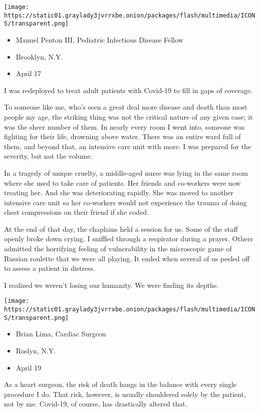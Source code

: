 \texttt{[image: https://static01.graylady3jvrrxbe.onion/packages/flash/multimedia/ICONS/transparent.png]}

\begin{itemize}
\tightlist
\item
  Manuel Penton III, Pediatric Infectious Disease Fellow
\item
  Brooklyn, N.Y.
\item
  April 17
\end{itemize}

I was redeployed to treat adult patients with Covid-19 to fill in gaps
of coverage.

To someone like me, who's seen a great deal more disease and death than
most people my age, the striking thing was not the critical nature of
any given case; it was the sheer number of them. In nearly every room I
went into, someone was fighting for their life, drowning above water.
There was an entire ward full of them, and beyond that, an intensive
care unit with more. I was prepared for the severity, but not the
volume.

In a tragedy of unique cruelty, a middle-aged nurse was lying in the
same room where she used to take care of patients. Her friends and
co-workers were now treating her. And she was deteriorating rapidly. She
was moved to another intensive care unit so her co-workers would not
experience the trauma of doing chest compressions on their friend if she
coded.

At the end of that day, the chaplains held a session for us. Some of the
staff openly broke down crying. I sniffled through a respirator during a
prayer. Others admitted the horrifying feeling of vulnerability in the
microscopic game of Russian roulette that we were all playing. It ended
when several of us peeled off to assess a patient in distress.

I realized we weren't losing our humanity. We were finding its depths.

\texttt{[image: https://static01.graylady3jvrrxbe.onion/packages/flash/multimedia/ICONS/transparent.png]}

\begin{itemize}
\tightlist
\item
  Brian Lima, Cardiac Surgeon
\item
  Roslyn, N.Y.
\item
  April 19
\end{itemize}

As a heart surgeon, the risk of death hangs in the balance with every
single procedure I do. That risk, however, is usually shouldered solely
by the patient, not by me. Covid-19, of course, has drastically altered
that.

